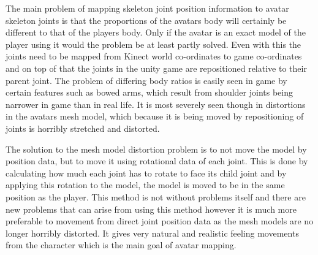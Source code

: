 \documentclass[a4paper,oneside]{memoir}
\begin{document}
				The main problem of mapping skeleton joint position information to avatar skeleton joints is that the proportions of the avatars body will certainly be different to that of the players body.
				Only if the avatar is an exact model of the player using it would the problem be at least partly solved.
				Even with this the joints need to be mapped from Kinect world co-ordinates to game co-ordinates and on top of that the joints in the unity game are repositioned relative to their parent joint.
				The problem of differing body ratios is easily seen in game by certain features such as bowed arms, which result from shoulder joints being narrower in game than in real life.
				It is most severely seen though in distortions in the avatars mesh model, which because it is being moved by repositioning of joints is horribly stretched and distorted.

				The solution to the mesh model distortion problem is to not move the model by position data, but to move it using rotational data of each joint.
				This is done by calculating how much each joint has to rotate to face its child joint and by applying this rotation to the model, the model is moved to be in the same position as the player.
				This method is not without problems itself and there are new problems that can arise from using this method however it is much more preferable to movement from direct joint position data as the mesh models are no longer horribly distorted.
				It gives very natural and realistic feeling movements from the character which is the main goal of avatar mapping.
\end{document}
